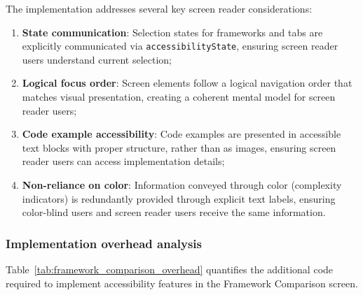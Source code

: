 The implementation addresses several key screen reader considerations:

\begin{enumerate}
    \item \textbf{State communication}: Selection states for frameworks and tabs are explicitly communicated via \texttt{accessibilityState}, ensuring screen reader users understand current selection;
    
    \item \textbf{Logical focus order}: Screen elements follow a logical navigation order that matches visual presentation, creating a coherent mental model for screen reader users;
    
    \item \textbf{Code example accessibility}: Code examples are presented in accessible text blocks with proper structure, rather than as images, ensuring screen reader users can access implementation details;
    
    \item \textbf{Non-reliance on color}: Information conveyed through color (complexity indicators) is redundantly provided through explicit text labels, ensuring color-blind users and screen reader users receive the same information.
\end{enumerate}

\subsubsection{Implementation overhead analysis}

Table~\ref{tab:framework_comparison_overhead} quantifies the additional code required to implement accessibility features in the Framework Comparison screen.


